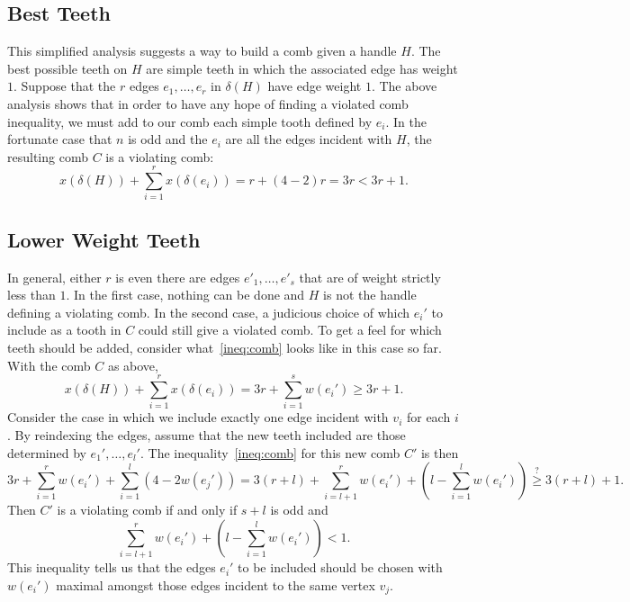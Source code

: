 \documentclass[12pt, letterpaper]{amsart}
\theoremstyle{plain}
\theoremstyle{definition}
\theoremstyle{remark}
\begin{document}
\subsection{Best Teeth}
This simplified analysis suggests a way to build a comb given a handle $H$. The
best possible teeth on $H$ are simple teeth in which the associated edge has
weight $1$. Suppose that the $r$ edges $e_1,\ldots,e_r$ in $\delta(H)$ have
edge weight $1$.  The above analysis shows that in order to have any hope of
finding a violated comb inequality, we must add to our comb each simple tooth
defined by $e_i$. In the fortunate case that $n$ is odd and the $e_i$ are all
the edges incident with $H$, the resulting comb $C$ is a violating comb:
\begin{equation*}
  x(\delta(H)) + \sum^r_{i = 1}x(\delta(e_i)) = r + (4 - 2)r = 3r < 3r + 1.
\end{equation*}

\subsection{Lower Weight Teeth}
In general, either $r$ is even there are edges $e'_1,\ldots,e'_s$ that are of
weight strictly less than $1$. In the first case, nothing can be done and $H$
is not the handle defining a violating comb. In the second case, a judicious
choice of which $e_i'$ to include as a tooth in $C$ could still give a violated
comb. To get a feel for which teeth should be added, consider what~\eqref{ineq:comb} looks
like in this case so far. With the comb $C$ as above,
\begin{equation*}
  x(\delta(H)) + \sum^r_{i = 1}x(\delta(e_i)) = 3r + \sum^s_{i = 1}w(e_i') \geq 3r + 1.
\end{equation*}
Consider the case in which we include exactly one edge incident with $v_i$ for
each $i$. By reindexing the edges, assume that the new teeth included are those
determined by $e_1',\ldots,e_l'$. The inequality~\eqref{ineq:comb} for this new comb $C'$
is then
\begin{equation*}
  3r + \sum^r_{i = 1} w(e_i') + \sum^l_{i = 1}(4 - 2w(e_j')) = 3(r+l) + \sum^r_{i = l+1}w(e_i') + \left(l - \sum^l_{i = 1}w(e_i')\right) \stackrel{?}{\geq} 3(r+l) + 1.
\end{equation*}
Then $C'$ is a violating comb if and only if $s + l$ is odd and
\begin{equation}\label{ineq:2}
  \sum^r_{i = l+1} w(e_i') + \left(l - \sum^l_{i = 1}w(e_i')\right) < 1.
\end{equation}
This inequality tells us that the edges $e_i'$ to be included should be chosen
with $w(e_i')$ maximal amongst those edges incident to the same vertex $v_j$.
\end{document}
